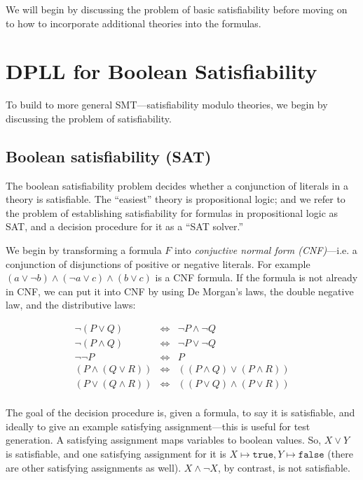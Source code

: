 \documentclass[11pt]{article}
\begin{document}
We will begin by discussing the problem of basic satisfiability before moving on
to how to incorporate additional theories into the formulas. 

\section{DPLL for Boolean Satisfiability}

To build to more general SMT---satisfiability modulo theories, we begin by
discussing the problem of satisfiability. 

\subsection{Boolean satisfiability (SAT)}

The boolean satisfiability problem decides whether a conjunction of literals in
a theory is satisfiable.  The ``easiest'' theory is propositional logic;
and we refer to the problem of establishing satisfiability for formulas in
propositional logic as SAT, and a decision procedure for it as a ``SAT solver.''

We begin by transforming a formula $F$ into \emph{conjuctive normal form
  (CNF)}---i.e. a conjunction of disjunctions of positive or negative literals.
For example $(a \lor \lnot b) \land (\lnot a \lor c) \land (b \lor c)$ is a CNF
formula. If the formula is not already in CNF, we can put it into CNF by using
De Morgan's laws, the double negative law, and the distributive laws:

\[
\begin{array}{rcl}
\lnot(P \lor Q) & \iff & \lnot P \land \lnot Q \\
\lnot (P \land Q) & \iff & \lnot P \lor \lnot Q \\
\lnot \lnot P & \iff & P \\
(P \land (Q \lor R)) & \iff & ((P \land Q) \lor (P \land R)) \\
(P \lor (Q \land R)) & \iff & ((P \lor Q) \land (P \lor R)) \\
\end{array}
\]

The goal of the decision procedure is, given a formula, to say it is
satisfiable, and ideally to give an example satisfying assignment---this is
useful for test generation. A satisfying assignment maps variables to boolean
values. So, $X \lor Y$ is satisfiable, and one satisfying assignment for it is
$X \mapsto \mathtt{true}, Y \mapsto \mathtt{false}$ (there are other satisfying
assignments as well). $X \land \lnot X$, by contrast, is not satisfiable.
\end{document}
